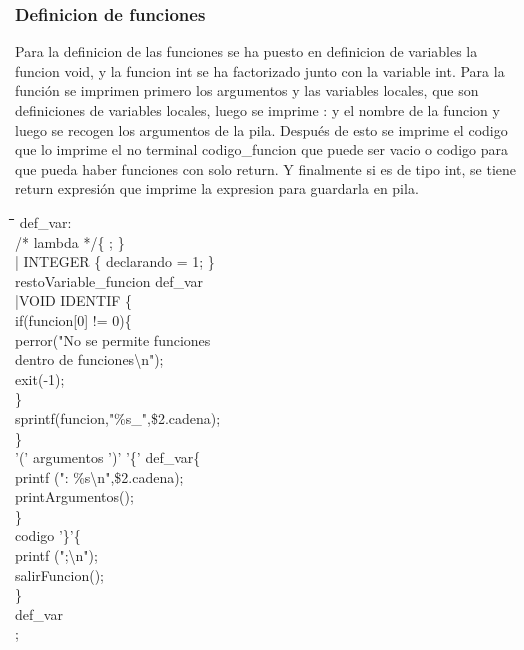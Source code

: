 \documentclass[11pt,spanish]{article}
\begin{document}
		\subsubsection*{Definicion de funciones}
		Para la definicion de las funciones se ha puesto en definicion de variables la funcion void, y la funcion int se ha factorizado junto con la variable int. Para la función se imprimen primero los argumentos y las variables locales, que son definiciones de variables locales, luego se imprime : y el nombre de la funcion y luego se recogen los argumentos de la pila. Después de esto se imprime el codigo que lo imprime el no terminal codigo\_funcion que puede ser vacio o codigo para que pueda haber funciones con solo return. Y finalmente si es de tipo int, se tiene return expresión que imprime la expresion para guardarla en pila.
		\begin{tcolorbox}
		\begin{tabbing}
			\hspace*{0.5cm}\=\hspace*{0.5cm}\= \hspace*{6cm}\=\hspace*{1cm}\=\hspace*{0.5cm}\=\hspace*{0.5cm}\=\kill
			def\_var:\\
			\>/* lambda */\{ ; \}\\
			\>| INTEGER \{ declarando = 1; \}\\
			\>\>restoVariable\_funcion def\_var\\
			\>|VOID IDENTIF\>\> \{\\
			\>\>\>\>if(funcion[0] != 0)\{\\
			\>\>\>\>\>perror("No se permite funciones\\
			\>\>\>\>\>\>dentro de funciones\textbackslash n");\\
			\>\>\>\>\>exit(-1);\\
			\>\>\>\>\>\}\\
			\>\>\>\>sprintf(funcion,"\%s\_",\$2.cadena);\\
			\>\>\>\}\\
			\>\>'(' argumentos ')' '\{' def\_var\>\{\\
			\>\>\>\>printf (": \%s\textbackslash n",\$2.cadena);\\
			\>\>\>\>printArgumentos();\\
			\>\>\>\}\\
			\>\>codigo '\}'\>\{\\
			\>\>\>\>printf (";\textbackslash n");\\
			\>\>\>\>salirFuncion();\\
			\>\>\>\}\\
			\>\>def\_var\\
			;
		\end{tabbing}
		\end{tcolorbox}
\end{document}
